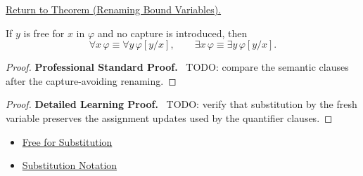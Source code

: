 \newpage
{}
\label{prf:rename}

\begin{remark*}[Return]
\hyperref[thm:rename]{Return to Theorem (Renaming Bound Variables).}
\end{remark*}

\begin{theorem*}
If \(y\) is free for \(x\) in \(\varphi\) and no capture is introduced, then
\[
\forall x\,\varphi\equiv\forall y\,\varphi[y/x],
\qquad
\exists x\,\varphi\equiv\exists y\,\varphi[y/x].
\]
\end{theorem*}

\begin{proof}
\textbf{Professional Standard Proof.}~
TODO: compare the semantic clauses after the capture-avoiding renaming.
\end{proof}

\begin{proof}
\textbf{Detailed Learning Proof.}~
TODO: verify that substitution by the fresh variable preserves the assignment
updates used by the quantifier clauses.
\end{proof}

\begin{remark*}
\end{remark*}

\begin{dependencies}
\begin{itemize}
  \item \hyperref[def:free-for]{Free for Substitution}
  \item \hyperref[def:subst-notation]{Substitution Notation}
\end{itemize}
\end{dependencies}

\clearpage
